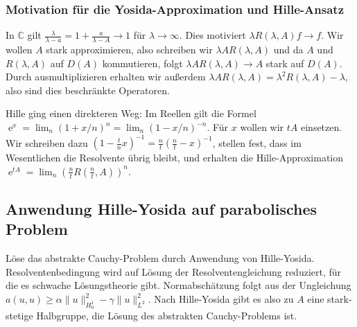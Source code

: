\documentclass[11pt,a4paper]{scrartcl}
\newcommand{\C}{\mathbb{C}} %
\theoremstyle{plain}
\theoremstyle{definition}
\theoremstyle{remark}
\DeclareMathOperator{\e}{e}
\begin{document}
\subsubsection{Motivation für die Yosida-Approximation und Hille-Ansatz}

In $\C$ gilt $\frac{\lambda}{\lambda-a}=1+\frac{a}{\lambda-A}\to 1$ für $\lambda\to\infty$. Dies motiviert $\lambda R(\lambda,A)f\to f$. Wir wollen $A$ stark approximieren, also schreiben wir $\lambda AR(\lambda,A)$ und da $A$ und $R(\lambda,A)$ auf $D(A)$ kommutieren, folgt $\lambda AR(\lambda,A)\to A$ stark auf $D(A)$. Durch ausmultiplizieren erhalten wir außerdem $\lambda AR(\lambda,A)=\lambda^2R(\lambda,A)-\lambda$, also sind dies beschränkte Operatoren.

Hille ging einen direkteren Weg: Im Reellen gilt die Formel $\e^x=\lim_n (1+x/n)^n=\lim_n (1-x/n)^{-n}$. Für $x$ wollen wir $tA$ einsetzen. Wir schreiben dazu $(1-\frac{t}{n}x)^{-1}=\frac{n}{t}(\frac{n}{t}-x)^{-1}$, stellen fest, dass im Wesentlichen die Resolvente übrig bleibt, und erhalten die Hille-Approximation $\e^{tA}=\lim_n (\frac{n}{t}R(\frac{n}{t},A))^n$.

\subsection{Anwendung Hille-Yosida auf parabolisches Problem}

Löse das abstrakte Cauchy-Problem durch Anwendung von Hille-Yosida. Resolventenbedingung wird auf Lösung der Resolventengleichung reduziert, für die es schwache Lösungstheorie gibt. Normabschätzung folgt aus der Ungleichung $a(u,u) \geq \alpha \|u\|_{H^1_0}^2 - \gamma \|u\|_{L^2}^2$. Nach Hille-Yosida gibt es also zu $A$ eine stark-stetige Halbgruppe, die Lösung des abstrakten Cauchy-Problems ist.
\end{document}
